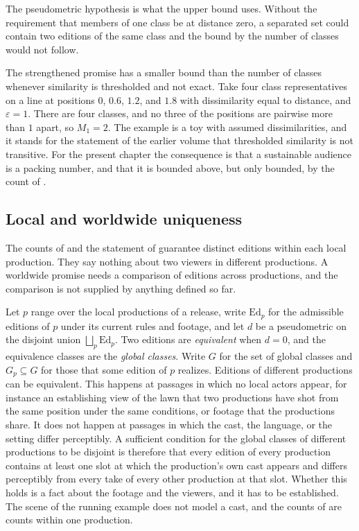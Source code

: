 \documentclass[11pt,twoside,openright]{book}
\theoremstyle{plain}
\theoremstyle{definition}
\theoremstyle{remark}
\newcommand{\Ed}{\mathrm{Ed}}       %
\begin{document}
The pseudometric hypothesis is what the upper bound uses. Without the requirement that members of one class be at distance zero, a separated set could contain two editions of the same class and the bound by the number of classes would not follow.

The strengthened promise has a smaller bound than the number of classes whenever similarity is thresholded and not exact. Take four class representatives on a line at positions $0$, $0.6$, $1.2$, and $1.8$ with dissimilarity equal to distance, and $\varepsilon=1$. There are four classes, and no three of the positions are pairwise more than $1$ apart, so $M_1=2$. The example is a toy with assumed dissimilarities, and it stands for the statement of the earlier volume that thresholded similarity is not transitive. For the present chapter the consequence is that a sustainable audience is a packing number, and that it is bounded above, but only bounded, by the count of .

\subsection{Local and worldwide uniqueness}\label{sec:scope}

The counts of  and the statement of  guarantee distinct editions within each local production. They say nothing about two viewers in different productions. A worldwide promise needs a comparison of editions across productions, and the comparison is not supplied by anything defined so far.

Let $p$ range over the local productions of a release, write $\Ed_p$ for the admissible editions of $p$ under its current rules and footage, and let $d$ be a pseudometric on the disjoint union $\bigsqcup_p\Ed_p$. Two editions are \emph{equivalent} when $d=0$, and the equivalence classes are the \emph{global classes}. Write $G$ for the set of global classes and $G_p\subseteq G$ for those that some edition of $p$ realizes. Editions of different productions can be equivalent. This happens at passages in which no local actors appear, for instance an establishing view of the lawn that two productions have shot from the same position under the same conditions, or footage that the productions share. It does not happen at passages in which the cast, the language, or the setting differ perceptibly. A sufficient condition for the global classes of different productions to be disjoint is therefore that every edition of every production contains at least one slot at which the production's own cast appears and differs perceptibly from every take of every other production at that slot. Whether this holds is a fact about the footage and the viewers, and it has to be established. The scene of the running example does not model a cast, and the counts of  are counts within one production.
\end{document}
